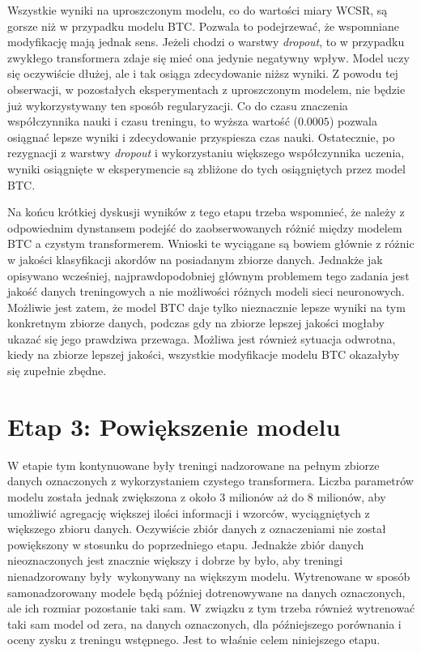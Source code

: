 Wszystkie wyniki na uproszczonym modelu, co do wartości miary WCSR, są gorsze niż w przypadku modelu BTC. Pozwala to podejrzewać, że wspomniane modyfikację mają jednak sens. Jeżeli chodzi o warstwy \emph{dropout}, to w przypadku zwykłego transformera zdaje się mieć ona jedynie negatywny wpływ. Model uczy się oczywiście dłużej, ale i tak osiąga zdecydowanie niższ wyniki. Z powodu tej obserwacji, w pozostałych eksperymentach z uproszczonym modelem, nie będzie już wykorzystywany ten sposób regularyzacji. Co do czasu znaczenia współczynnika nauki i czasu treningu, to wyższa wartość ($0.0005$) pozwala osiągnać lepsze wyniki i zdecydowanie przyspiesza czas nauki. Ostatecznie, po rezygnacji z warstwy \emph{dropout} i wykorzystaniu większego współczynnika uczenia, wyniki osiągnięte w eksperymencie  są zbliżone do tych osiągniętych przez model BTC.

Na końcu krótkiej dyskusji wyników z tego etapu trzeba wspomnieć, że należy z odpowiednim dynstansem podejść do zaobserwowanych różnić między modelem BTC a czystym transformerem. Wnioski te wyciągane są bowiem głównie z różnic w jakości klasyfikacji akordów na posiadanym zbiorze danych. Jednakże jak opisywano wcześniej, najprawdopodobniej głównym problemem tego zadania jest jakość danych treningowych a nie możliwości różnych modeli sieci neuronowych. Możliwie jest zatem, że model BTC daje tylko nieznacznie lepsze wyniki na tym konkretnym zbiorze danych, podczas gdy na zbiorze lepszej jakości mogłaby ukazać się jego prawdziwa przewaga. Możliwa jest również sytuacja odwrotna, kiedy na zbiorze lepszej jakości, wszystkie modyfikacje modelu BTC okazałyby się zupełnie zbędne.



\section{Etap 3: Powiększenie modelu}

W etapie tym kontynuowane były treningi nadzorowane na pełnym zbiorze danych oznaczonych z wykorzystaniem czystego transformera. Liczba parametrów modelu została jednak zwiększona z około $3$ milionów aż do $8$ milionów, aby umożliwić agregację większej ilości informacji i wzorców, wyciągniętych z większego zbioru danych. Oczywiście zbiór danych z oznaczeniami nie został powiększony w stosunku do poprzedniego etapu. Jednakże zbiór danych nieoznaczonych jest znacznie większy i dobrze by było, aby treningi nienadzorowany były wykonywany na większym modelu. Wytrenowane w sposób samonadzorowany modele będą później dotrenowywane na danych oznaczonych, ale ich rozmiar pozostanie taki sam. W związku z tym trzeba również wytrenować taki sam model od zera, na danych oznaczonych, dla późniejszego porównania i oceny zysku z treningu wstępnego. Jest to właśnie celem niniejszego etapu.

